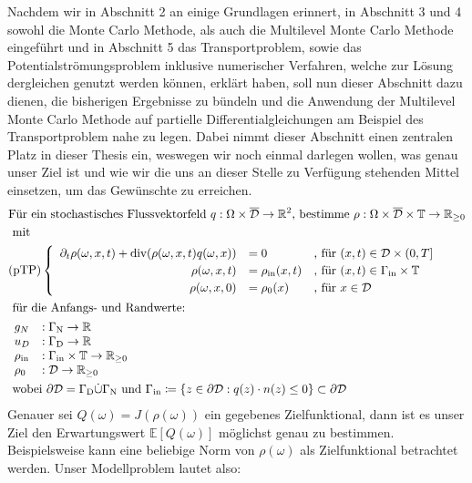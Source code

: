 Nachdem wir in Abschnitt 2 an einige Grundlagen erinnert, in Abschnitt 3 und 4 sowohl die Monte Carlo Methode, als auch die Multilevel Monte Carlo Methode eingeführt und in Abschnitt 5 das Transportproblem, sowie das Potentialströmungsproblem inklusive numerischer Verfahren, welche zur Lösung dergleichen genutzt werden können, erklärt haben, soll nun dieser Abschnitt dazu dienen, die bisherigen Ergebnisse zu bündeln und die Anwendung der Multilevel Monte Carlo Methode auf partielle Differentialgleichungen am Beispiel des Transportproblem nahe zu legen. Dabei nimmt dieser Abschnitt einen zentralen Platz in dieser Thesis ein, weswegen wir noch einmal darlegen wollen, was genau unser Ziel ist und wie wir die uns an dieser Stelle zu Verfügung stehenden Mittel einsetzen, um das Gewünschte zu erreichen.
\begin{align*}
&\text{Für ein stochastisches Flussvektorfeld } q: \Omega \times \overline{\mathcal{D}} \to \R^2 \text{, bestimme }\rho: \Omega \times \overline{\mathcal{D}} \times \mathbb{T} \to \R_{\geq 0}\\ 
&\text{ mit} \\
&\text{(pTP)} 
\begin{cases}
\begin{array}{rlll}
\partial_t \rho (\omega, x, t) + \dive(\rho(\omega,x,t)q(\omega,x)) &= 0 &\text{, für } (x,t) \in \mathcal{D} \times (0,T] \\
\rho(\omega,x,t) &= \rho_{\text{in}}(x,t) &\text{, für } (x,t) \in \Gamma_{\text{in}} \times \mathbb{T} \\
\rho(\omega,x,0)  &= \rho_0(x) &\text{, für } x \in  \mathcal{D}
\end{array}
\end{cases} \\
&\text{ für die Anfangs- und Randwerte: } \\ 
&\begin{array}{llr}
g_N&: \Gamma_{\text{N}} \to \R \\
u_D&: \Gamma_{\text{D}} \to \R \\
\rho_{\text{in}}&: \Gamma_{\text{in}} \times \mathbb{T} \to \R_{\geq0} \\
\rho_0&: \mathcal{D} \to \R_{\geq0} \\
\end{array} \newline \\
&\text{ wobei } \partial \mathcal{D} = \Gamma_{\text{D}} \dot{\cup} \Gamma_{\text{N}}  \text{ und }  \Gamma_{\text{in}} \coloneqq  \{ z \in \partial \mathcal{D}: q(z)\cdot n(z) \leq 0 \} \subset  \partial \mathcal{D}
\end{align*}
Genauer sei $ Q(\omega) = J(\rho(\omega)) $ ein gegebenes Zielfunktional, dann ist es unser Ziel den Erwartungswert $ \mathbb{E}[Q(\omega)] $ möglichst genau zu bestimmen. Beispielsweise kann eine beliebige Norm von $ \rho(\omega) $ als Zielfunktional betrachtet werden.
Unser Modellproblem lautet also:

